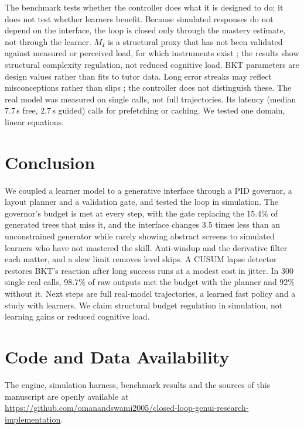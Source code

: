 \documentclass[conference]{IEEEtran}
\begin{document}
The benchmark tests whether the controller does what it is designed to do; it
does not test whether learners benefit. Because simulated responses do not
depend on the interface, the loop is closed only through the mastery
estimate, not through the learner. $M_I$ is a structural proxy that has not
been validated against measured or perceived load, for which instruments
exist \cite{leppink2013instrument}; the results show structural complexity
regulation, not reduced cognitive load. BKT
parameters are design values rather than fits to tutor data. Long error
streaks may reflect misconceptions rather than slips
\cite{booth2014persistent}; the controller does not distinguish these.
The real model was measured on single calls, not full trajectories. Its latency (median 7.7\,s free,
2.7\,s guided) calls for prefetching or caching. We tested one domain, linear equations.

\section{Conclusion}
We coupled a learner model to a generative interface through a PID
governor, a layout planner and a validation gate, and tested the loop in
simulation. The governor's budget is met at every step, with the gate
replacing the 15.4\% of generated trees that miss it, and the interface changes 3.5 times less than an
unconstrained generator while rarely showing abstract screens to simulated
learners who have not mastered the skill. Anti-windup and the derivative filter each
matter, and a slew limit removes level skips. A CUSUM lapse detector restores
BKT's reaction after long success runs at a modest cost in jitter. In 300 single real calls, 98.7\% of
raw outputs met the budget with the planner and 92\% without it. Next steps are full
real-model trajectories, a learned fast policy and a study with learners. We claim
structural budget regulation in simulation, not learning gains or reduced
cognitive load.

\section*{Code and Data Availability}
The engine, simulation harness, benchmark results and the sources of
this manuscript are openly available at \url{https://github.com/omanandswami2005/closed-loop-genui-research-implementation}.



\end{document}
